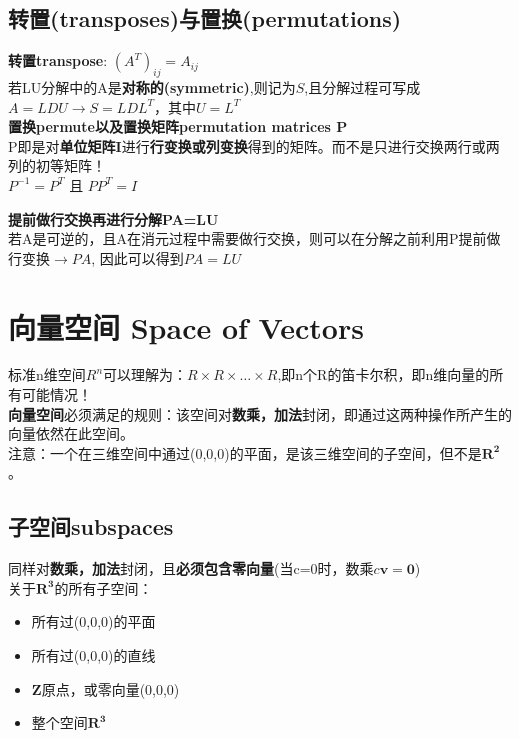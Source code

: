 \documentclass[UTF8]{article}
\begin{document}
    \subsection{转置(transposes)与置换(permutations)}
    \textbf{转置transpose}: $(A^T)_{ij} = A_{ij}$\\
    若LU分解中的A是\textbf{对称的(symmetric)},则记为$S$,且分解过程可写成$A=LDU \rightarrow S=LDL^T$，其中$U=L^T$
    \\
    \textbf{置换permute以及置换矩阵permutation matrices P}\\
    P即是对\textbf{单位矩阵I}进行\textbf{行变换或列变换}得到的矩阵。而不是只进行交换两行或两列的初等矩阵！\\
    $P^{-1} = P^T$ 且 $PP^T = I$

    \textbf{提前做行交换再进行分解PA=LU}\\
    若A是可逆的，且A在消元过程中需要做行交换，则可以在分解之前利用P提前做行变换$\rightarrow PA$,
    因此可以得到$PA=LU$

    \section{向量空间 Space of Vectors}
    标准n维空间$R^n$可以理解为：$R \times R \times \dots \times R$,即n个R的笛卡尔积，即n维向量的所有可能情况！
    \\
    \textbf{向量空间}必须满足的规则：该空间对\textbf{数乘，加法}封闭，即通过这两种操作所产生的向量依然在此空间。
    \\
    注意：一个在三维空间中通过(0,0,0)的平面，是该三维空间的子空间，但不是$\bm{R^2}$。\\
    \subsection{子空间subspaces}
    同样对\textbf{数乘，加法}封闭，且\textbf{必须包含零向量}(当c=0时，数乘$c \bm{v}=\bm{0}$)
    \\
    关于$\bm{R^3}$的所有子空间：
    \begin{itemize}
        \item 所有过(0,0,0)的平面
        \item 所有过(0,0,0)的直线
        \item $\bm{Z}$原点，或零向量(0,0,0)
        \item 整个空间$\bm{R^3}$
    \end{itemize}
\end{document}
